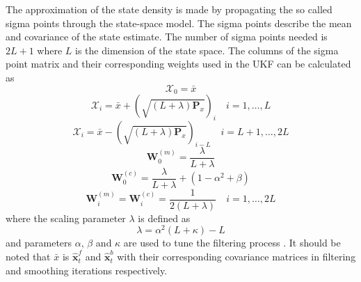 \documentclass[12pt]{iopart}		%
\begin{document}
The approximation of the state density is made by propagating the so called sigma points through the state-space model. The sigma points describe the mean and covariance of the state estimate. The number of sigma points needed is $2L+1$ where $L$ is the dimension of the state space. The columns of the sigma point matrix and their corresponding weights used in the UKF can be calculated as
\begin{equation}
 \mathcal X_{0}=\bar x
\end{equation}
\begin{equation}
 \mathcal X_{i}=\bar x+(\sqrt{( L + \lambda)\mathbf P_x})_i \quad i=1, \dots,  L
\end{equation}
\begin{equation}
 \mathcal X_{i}=\bar x-(\sqrt{( L + \lambda)\mathbf P_x})_{i- L} \quad i= L+1, \dots, 2 L
\end{equation}
\begin{equation}
 \mathbf W_0^{(m)}=\frac{\lambda}{ L+\lambda}
\end{equation}
\begin{equation}
 \mathbf W_0^{(c)}=\frac{\lambda}{ L+\lambda}+(1-\alpha^2+\beta)
\end{equation}
\begin{equation}
 \mathbf W_i^{(m)}=\mathbf W_i^{(c)}=\frac{1}{2( L+\lambda)} \quad i=1, \dots, 2L
\end{equation}
where the scaling parameter $\lambda$ is defined as
\begin{equation}
\lambda=\alpha^2( L+\kappa)- L 
\end{equation}
and parameters $\alpha$, $\beta$ and $\kappa$ are used to tune the filtering process \cite{Haykin2001}. It should be noted that $\bar x$ is $ \hat{\mathbf x}_t^{f} $ and $ \hat{\mathbf x}_t^{b} $ with their corresponding covariance matrices in filtering and smoothing iterations respectively.

\end{document}
